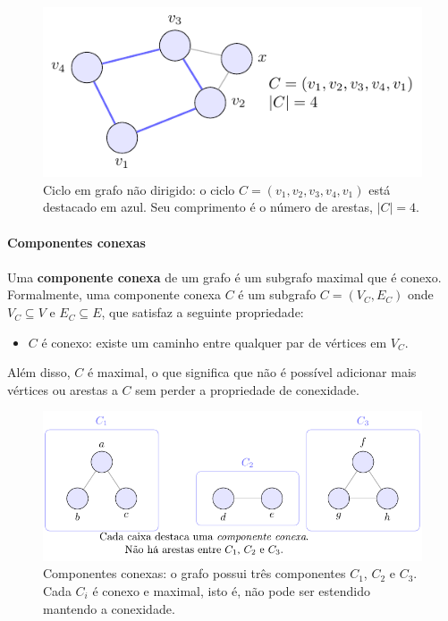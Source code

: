 \documentclass[12pt,a4paper]{article}
\def\emph#1{#1}%
\begin{document}
\begin{figure}[H]
    \centering
    \includegraphics[width=0.9\linewidth]{figures/fig_ciclo.pdf}

    \caption{Ciclo em grafo não dirigido: o ciclo $C=(v_1,v_2,v_3,v_4,v_1)$ está destacado em azul. Seu comprimento é o número de arestas, $|C|=4$.}
    \label{fig:ciclo}\end{figure}


\paragraph{Componentes conexas}
\paragraph{}Uma \textbf{componente conexa} de um grafo é um subgrafo maximal que é conexo. Formalmente, uma componente conexa \(C\) é um subgrafo \(C = (V_C, E_C)\) onde \(V_C \subseteq V\) e \(E_C \subseteq E\), que satisfaz a seguinte propriedade:
\begin{itemize}
    \item \(C\) é conexo: existe um caminho entre qualquer par de vértices em \(V_C\).
\end{itemize}
Além disso, \(C\) é maximal, o que significa que não é possível adicionar mais vértices ou arestas a \(C\) sem perder a propriedade de conexidade.


\begin{figure}[H]
    \centering
    \includegraphics[width=0.9\linewidth]{figures/fig_componentes.pdf}

    \caption{Componentes conexas: o grafo possui três componentes $C_1$, $C_2$ e $C_3$. Cada $C_i$ é conexo e \emph{maximal}, isto é, não pode ser estendido mantendo a conexidade.}
    \label{fig:componentes}
\end{figure}
\end{document}
